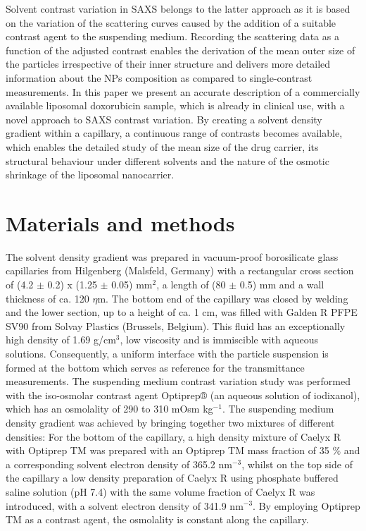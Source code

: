 Solvent contrast variation in SAXS belongs to the latter approach as it is based on the variation of the scattering curves caused by the addition of a suitable contrast agent to the suspending medium. Recording the scattering data as a function of the adjusted contrast enables the derivation of the mean outer size of the particles irrespective of their inner structure and delivers more detailed information about the NPs composition as compared to single-contrast measurements. In this paper we present an accurate description of a commercially available liposomal doxorubicin sample, which is already in clinical use, with a novel approach to SAXS contrast variation. By creating a solvent density gradient within a capillary, a continuous range of contrasts becomes available, which enables the detailed study of the mean size of the drug carrier, its structural behaviour under different solvents and the nature of the osmotic shrinkage of the liposomal nanocarrier.

\section{Materials and methods}
The solvent density gradient was prepared in vacuum-proof borosilicate glass capillaries from Hilgenberg (Malsfeld, Germany) with a rectangular cross section of (4.2 $\pm$ 0.2) x (1.25 $\pm$ 0.05) mm$^2$, a length of (80 $\pm$ 0.5) mm and a wall thickness of ca. 120 $\eta$m. The bottom end of the capillary was closed by welding and the lower section, up to a height of ca. 1 cm, was filled with Galden R PFPE SV90 from Solvay Plastics (Brussels, Belgium). This fluid has an exceptionally high density of 1.69 g/cm$^3$, low viscosity and is immiscible with aqueous solutions. Consequently, a uniform interface with the particle suspension is formed at the bottom which serves as reference for the transmittance measurements. The suspending medium contrast variation study was performed with the iso-osmolar contrast agent Optiprep® (an aqueous solution of iodixanol), which has an osmolality of 290 to 310 mOsm kg$^{-1}$. The suspending medium density gradient was achieved by bringing together two mixtures of different densities: For the bottom of the capillary, a high density mixture of Caelyx R with Optiprep TM was prepared with an Optiprep TM mass fraction of 35 $\%$ and a corresponding solvent electron density of 365.2 nm$^{-3}$, whilst on the top side of the capillary a low density preparation of Caelyx R  using phosphate buffered saline solution (pH 7.4) with the same volume fraction of Caelyx R was introduced, with a solvent electron density of 341.9 nm$^{-3}$. By employing Optiprep TM as a contrast agent, the osmolality is constant along the capillary. 

